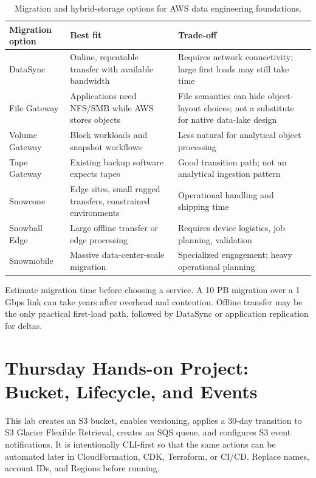 \begin{table}[H]
\centering
\small
\begin{tabular}{@{}p{3.2cm}p{4.8cm}p{5.3cm}@{}}
\toprule
\textbf{Migration option} & \textbf{Best fit} & \textbf{Trade-off} \\
\midrule
DataSync & Online, repeatable transfer with available bandwidth & Requires network connectivity; large first loads may still take time \\
File Gateway & Applications need NFS/SMB while AWS stores objects & File semantics can hide object-layout choices; not a substitute for native data-lake design \\
Volume Gateway & Block workloads and snapshot workflows & Less natural for analytical object processing \\
Tape Gateway & Existing backup software expects tapes & Good transition path; not an analytical ingestion pattern \\
Snowcone & Edge sites, small rugged transfers, constrained environments & Operational handling and shipping time \\
Snowball Edge & Large offline transfer or edge processing & Requires device logistics, job planning, validation \\
Snowmobile & Massive data-center-scale migration & Specialized engagement; heavy operational planning \\
\bottomrule
\end{tabular}
\caption{Migration and hybrid-storage options for AWS data engineering foundations.}
\label{tab:migration-options}
\end{table}

\begin{tipbox}
Estimate migration time before choosing a service. A 10 PB migration over a 1 Gbps link can take years after overhead and contention. Offline transfer may be the only practical first-load path, followed by DataSync or application replication for deltas.
\end{tipbox}

\section{Thursday Hands-on Project: Bucket, Lifecycle, and Events}
This lab creates an S3 bucket, enables versioning, applies a 30-day transition to S3 Glacier Flexible Retrieval, creates an SQS queue, and configures S3 event notifications. It is intentionally CLI-first so that the same actions can be automated later in CloudFormation, CDK, Terraform, or CI/CD. Replace names, account IDs, and Regions before running.

